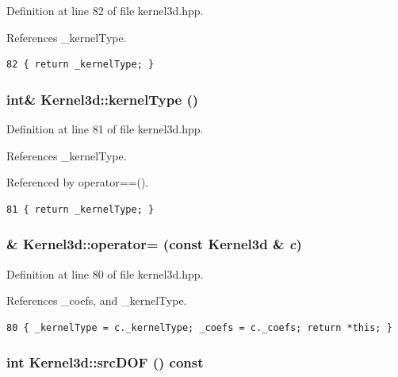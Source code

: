 Definition at line 82 of file kernel3d.hpp.

References \_\-kernel\-Type.

\footnotesize\begin{verbatim}82 { return _kernelType; }
\end{verbatim}\normalsize 


\subsubsection{\setlength{\rightskip}{0pt plus 5cm}int\& Kernel3d::kernel\-Type ()\hspace{0.3cm}{\tt  [inline]}}\label{classKernel3d_dafce73fc921ab6ff4e38f86e70c2c0c_dafce73fc921ab6ff4e38f86e70c2c0c}




Definition at line 81 of file kernel3d.hpp.

References \_\-kernel\-Type.

Referenced by operator==().

\footnotesize\begin{verbatim}81 { return _kernelType; }
\end{verbatim}\normalsize 


\subsubsection{\& Kernel3d::operator= (const {\bf Kernel3d} \& {\em c})\hspace{0.3cm}{\tt  [inline]}}\label{classKernel3d_c7f881cb3ae0c6b729b60acb716c06cd_c7f881cb3ae0c6b729b60acb716c06cd}




Definition at line 80 of file kernel3d.hpp.

References \_\-coefs, and \_\-kernel\-Type.

\footnotesize\begin{verbatim}80 { _kernelType = c._kernelType; _coefs = c._coefs; return *this; }
\end{verbatim}\normalsize 


\subsubsection{\setlength{\rightskip}{0pt plus 5cm}int Kernel3d::src\-DOF () const}\label{classKernel3d_a4664ea62cfb9d75bcb6d17538746158_a4664ea62cfb9d75bcb6d17538746158}




